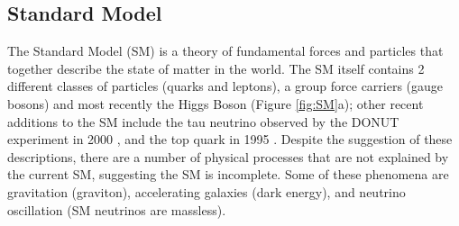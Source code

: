 \documentclass[12pt]{article}
\begin{document}
\subsection{Standard Model}
The Standard Model (SM) is a theory of fundamental forces and particles that together describe the state of matter in the world. The SM itself contains 2 different classes of particles (quarks and leptons), a group force carriers (gauge bosons) and most recently the Higgs Boson (Figure \ref{fig:SM}a); other recent additions to the SM include the tau neutrino observed by the DONUT experiment in 2000 \cite{bib:donut}, and the top quark in 1995 \cite{bib:cdf}. Despite the suggestion of these descriptions, there are a number of physical processes that are not explained by the current SM, suggesting the SM is incomplete.  Some of these phenomena are gravitation (graviton), accelerating galaxies (dark energy), and neutrino oscillation (SM neutrinos are massless). 
\end{document}
